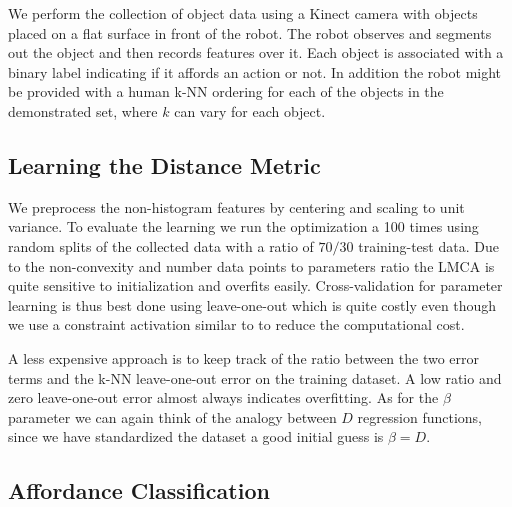 We perform the collection of object data using a Kinect camera with
objects placed on a flat surface in front of the robot. The robot
observes and segments out the object and then records features over it.
Each object is associated with a binary label indicating if it affords
an action or not. In addition the robot might be provided with a human
k-NN ordering for each of the objects in the demonstrated set, where
\(k\) can vary for each object.

\subsection{Learning the Distance
Metric}\label{learning-the-distance-metric}

We preprocess the non-histogram features by centering and scaling to
unit variance. To evaluate the learning we run the optimization a 100
times using random splits of the collected data with a ratio of
\(70/30\) training-test data. Due to the non-convexity and number data
points to parameters ratio the LMCA is quite sensitive to initialization
and overfits easily. Cross-validation for parameter learning is thus
best done using leave-one-out which is quite costly even though we use a
constraint activation similar to \cite{Weinberger:2009to} to reduce the
computational cost.

A less expensive approach is to keep track of the ratio between the two
error terms and the k-NN leave-one-out error on the training dataset. A
low ratio and zero leave-one-out error almost always indicates
overfitting. As for the \(\beta\) parameter we can again think of the
analogy between \(D\) regression functions, since we have standardized
the dataset a good initial guess is \(\beta=D\).

\subsection{Affordance Classification}\label{affordance-classification}


